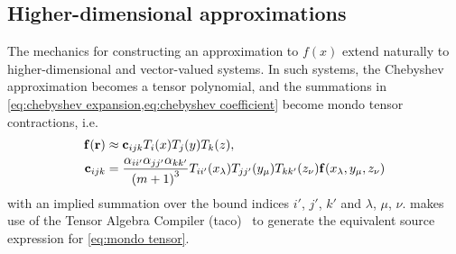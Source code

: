 \subsection{Higher-dimensional approximations}
The mechanics for constructing an approximation to $f(x)$ extend naturally to higher-dimensional and vector-valued systems.
In such systems, the Chebyshev approximation becomes a tensor polynomial, and the summations in \cref{eq:chebyshev expansion,eq:chebyshev coefficient} become mondo tensor contractions, i.e.
\begin{subequations}
  \begin{align}
    \vb{f}(\vb{r}) &\approx \vb{c}_{ijk} T_i(x) T_j(y) T_k(z), \\
    \vb{c}_{ijk} &= \frac{\alpha_{ii'} \alpha_{jj'} \alpha_{kk'}}{\qty(m+1)^3} T_{ii'}(x_\lambda) T_{jj'}(y_\mu) T_{kk'}(z_\nu) \vb{f}(x_\lambda, y_\mu, z_\nu) \label{eq:mondo tensor}
  \end{align}
\end{subequations}
with an implied summation over the bound indices $i'$, $j'$, $k'$ and $\lambda$, $\mu$, $\nu$.
\QuEST{} makes use of the Tensor Algebra Compiler (taco)~\cite{taco} to generate the equivalent source expression for \cref{eq:mondo tensor}.
